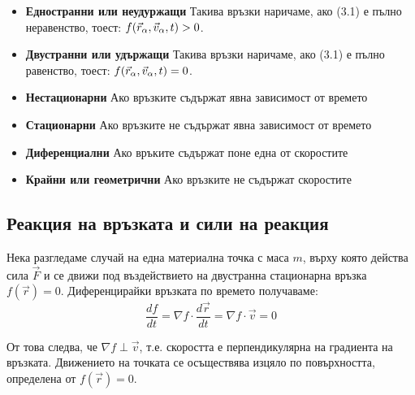 \documentclass{report}
\begin{document}
\begin{itemize}
    \item \textbf{Едностранни или неудуржащи}
    \subitem Такива връзки наричаме, ако (3.1) е пълно неравенство, тоест: $f(\vec{r}_\alpha, \space \vec{v}_\alpha, \space t)> 0$.
    \item \textbf{Двустранни или удържащи}
    \subitem Такива връзки наричаме, ако (3.1) е пълно равенство, тоест: $f(\vec{r}_\alpha, \space \vec{v}_\alpha, \space t)= 0$.
    \item \textbf{Нестационарни}
    \subitem Ако връзките съдържат явна зависимост от времето
    \item \textbf{Стационарни}
    \subitem Ако връзките не съдържат явна зависимост от времето
    \item \textbf{Диференциални}
    \subitem Ако връките съдържат поне една от скоростите
    \item \textbf{Крайни или геометрични}
    \subitem Ако връзките не съдържат скоростите
\end{itemize}

\subsection{Реакция на връзката и сили на реакция}
Нека разгледаме случай на една материална точка с маса $m$, върху която действа сила $\vec{F}$ и се движи под въздействието на двустранна стационарна връзка $f(\vec{r})=0$. Диференцирайки връзката по времето получаваме:
\begin{equation}
\frac{df}{dt} = \nabla f \cdot \frac{d\vec{r}}{dt} = \nabla f \cdot \vec{v} = 0
\end{equation}

От това следва, че $\nabla f \perp \vec{v}$, т.е. скоростта е перпендикулярна на градиента на връзката. Движението на точката се осъществява изцяло по повърхността, определена от $f(\vec{r})=0$. 
\end{document}

